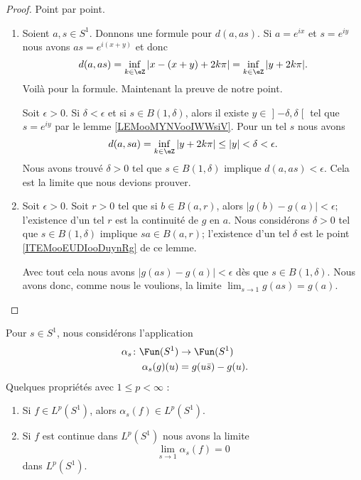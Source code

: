 \begin{proof}
	Point par point.
	\begin{enumerate}
		\item
		      Soient \( a,s\in S^1\). Donnons une formule pour \( d(a,as)\). Si \( a= e^{ix}\) et \( s= e^{iy}\) nous avons \( as= e^{i(x+y)}\) et donc
		      \begin{equation}
			      d(a,as)=\inf_{k\in \eZ}| x-(x+y)+2k\pi |=\inf_{k\in \eZ}| y+2k\pi |.
		      \end{equation}
		      Voilà pour la formule. Maintenant la preuve de notre point.

		      Soit \( \epsilon>0\). Si \( \delta<\epsilon\) et si \( s\in B(1,\delta)\), alors il existe \( y\in \mathopen] -\delta , \delta \mathclose[\) tel que \( s= e^{iy}\) par le lemme \ref{LEMooMYNVooIWWsiV}. Pour un tel \( s\) nous avons
		      \begin{equation}
			      d(a,sa)=\inf_{k\in \eZ}| y+2k\pi |\leq | y |<\delta<\epsilon.
		      \end{equation}
		      Nous avons trouvé \( \delta>0\) tel que \( s\in B(1,\delta)\) implique \( d(a,as)<\epsilon\). Cela est la limite que nous devions prouver.
		\item
		      Soit \( \epsilon>0\). Soit \( r>0\) tel que si \( b\in B(a,r)\), alors \( | g(b)-g(a) |<\epsilon\); l'existence d'un tel \( r\) est la continuité de \( g\) en \( a\). Nous considérons \( \delta>0\) tel que \( s\in B(1,\delta)\) implique \( sa\in B(a,r)\); l'existence d'un tel \( \delta\) est le point \ref{ITEMooEUDIooDuynRg} de ce lemme.

		      Avec tout cela nous avons \( | g(as)-g(a) |<\epsilon\) dès que \( s\in B(1,\delta)\). Nous avons donc, comme nous le voulions, la limite \( \lim_{s\to 1} g(as)=g(a)\).
	\end{enumerate}
\end{proof}

\begin{lemma}
	Pour \( s\in S^1\), nous considérons l'application
	\begin{equation}
		\begin{aligned}
			\alpha_s\colon \Fun(S^1) & \to \Fun(S^1)     \\
			\alpha_s(g)(u)           & =g(u\bar s)-g(u).
		\end{aligned}
	\end{equation}
	Quelques propriétés avec \( 1\leq p<\infty\) :
	\begin{enumerate}
		\item
		      Si \( f\in L^p(S^1)\), alors \( \alpha_s(f)\in L^p(S^1)\).
		\item
		      Si \( f\) est continue dans \( L^p(S^1)\) nous avons la limite
		      \begin{equation}
			      \lim_{s\to 1} \alpha_s(f)=0
		      \end{equation}
		      dans \( L^p(S^1)\).
	\end{enumerate}
\end{lemma}

